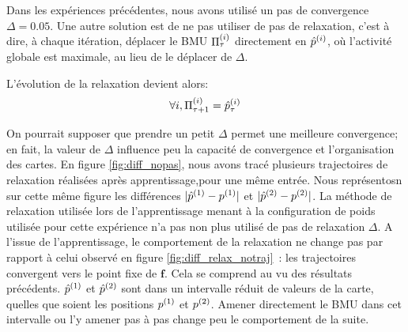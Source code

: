 \documentclass[../main]{subfiles}
\begin{document}
Dans les expériences précédentes, nous avons utilisé un pas de convergence $\Delta=0.05$.
Une autre solution est de ne pas utiliser de pas de relaxation, c'est à dire, à chaque itération, déplacer le BMU $\Pi^{({i})}_\tau$ directement en $\hat{p}^{({i})}$, où l'activité globale est maximale, au lieu de le déplacer de $\Delta$.

L'évolution de la relaxation devient alors:
\begin{equation}
\forall i, \Pi^{({i})}_{\tau+1} = \hat{p}^{({i})}_{\tau}
\end{equation}

On pourrait supposer que prendre un petit $\Delta$ permet une meilleure convergence; en fait, la valeur de $\Delta$ influence peu la capacité de convergence et l'organisation des cartes.
En figure \ref{fig:diff_nopas}, nous avons tracé plusieurs trajectoires de relaxation réalisées après apprentissage,pour une même entrée. 
Nous représentosn sur cette même figure les différences $\lvert \hat{p}^{({1})} - p^{({1})} \rvert$ et $\lvert \hat{p}^{({2})} - p^{({2})} \rvert$.
La méthode de relaxation utilisée lors de l'apprentissage menant à la configuration de poids utilisée pour cette expérience n'a pas non plus utilisé de pas de relaxation $\Delta$.
A l'issue de l'apprentissage, le comportement de la relaxation ne change pas par rapport à celui observé en figure \ref{fig:diff_relax_notraj}~: les trajectoires convergent vers le point fixe de $\mathbf{f}$.
Cela se comprend au vu des résultats précédents. $\hat{p}^{({1})}$ et $\hat{p}^{({2})}$ sont dans un intervalle réduit de valeurs de la carte, quelles que soient les positions $p^{({1})}$ et $p^{({2})}$. 
Amener directement le BMU dans cet intervalle ou l'y amener pas à pas change peu le comportement de la suite. 
\end{document}
